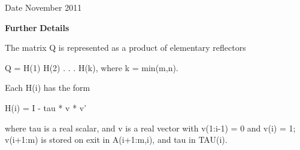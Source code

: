 \begin{DoxyDate}{Date}
November 2011
\end{DoxyDate}
{\bfseries Further} {\bfseries Details} \begin{DoxyVerb}  The matrix Q is represented as a product of elementary reflectors

     Q = H(1) H(2) . . . H(k), where k = min(m,n).

  Each H(i) has the form

     H(i) = I - tau * v * v'

  where tau is a real scalar, and v is a real vector with
  v(1:i-1) = 0 and v(i) = 1; v(i+1:m) is stored on exit in A(i+1:m,i),
  and tau in TAU(i).\end{DoxyVerb}
 
